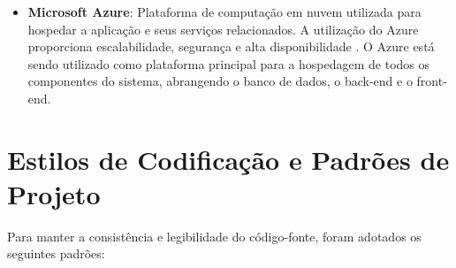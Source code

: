 \documentclass[
	12pt,				%
	openany,			%
	twoside,			%
	a4paper,			%
	english,			%
	brazil				%
	]{abntex2}
\begin{document}
\begin{itemize}
    \item \textbf{Microsoft Azure}: Plataforma de computação em nuvem utilizada para hospedar a aplicação e seus serviços relacionados. A utilização do Azure proporciona escalabilidade, segurança e alta disponibilidade \cite{Azure2025}. O Azure está sendo utilizado como plataforma principal para a hospedagem de todos os componentes do sistema, abrangendo o banco de dados, o back-end e o front-end.
\end{itemize}

\section{Estilos de Codificação e Padrões de Projeto}
Para manter a consistência e legibilidade do código-fonte, foram adotados os seguintes padrões:
\end{document}

